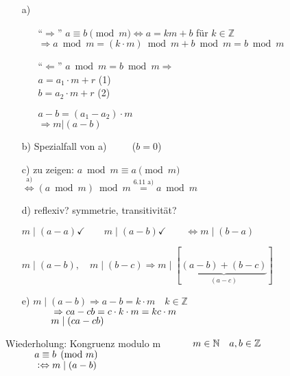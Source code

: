 \documentclass[a4paper, 12pt, twoside] {article}
\begin{document}
\begin{itemize}

\item[a)] \begin{itemize}

\item["`$\Rightarrow$"'] $ a \equiv b \pmod m \Leftrightarrow a = k m + b$ für $k \in \mathbb{Z}$ \\
$\Rightarrow a \bmod m = (k  \cdot  m) \bmod m + b \bmod m = b \bmod m$

\item["`$\Leftarrow$"'] $a \bmod m = b \bmod m \Rightarrow$ \\
$a = a_1 \cdot m + r$ (1) \\
$b = a_2 \cdot m + r$ (2)

$a -b = (a_1 - a_2) \cdot m$ \\
$\Rightarrow m | (a -b)$

\end{itemize}

\item[b)] Spezialfall von a) $\qquad$ ($b=0$)


\item[c)] zu zeigen: $a \bmod m \equiv a \pmod m$ \\
$\overset{\text{a)}}{\Leftrightarrow} (a \bmod m) \bmod m \overset{\text{6.11 a)}}{=} a \bmod m$

\item[d)] reflexiv? symmetrie, transitivität?

$m \mid (a-a) \checkmark \qquad m \mid (a-b) \checkmark \qquad \Leftrightarrow m \mid (b-a)$ 

$m \mid (a-b), \quad m \mid (b-c) \Rightarrow m \mid [\underbrace{(a-b)+(b-c)}_{(a-c)}]$

\item[e)] $m \mid (a-b) \Rightarrow a-b = k \cdot m \quad k \in \mathbb{Z}$ \\
$\text{\qquad \quad} \Rightarrow ca-cb = c \cdot k \cdot m = kc \cdot m$ \\
$\text{\qquad \quad} m \mid (ca-cb)$

\end{itemize}

Wiederholung: Kongruenz modulo m
$\text{\qquad \quad} m \in \mathbb{N} \quad a,b \in \mathbb{Z}$ \\
$\text{\qquad \quad} a \equiv b \pmod m$ \\
$\text{\qquad \quad} :\Leftrightarrow m \mid (a-b)$
\end{document}
